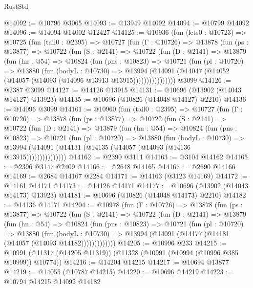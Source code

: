 \begin{lexlean}{RustStd}
\begin{coremodule}
@14092 := @10796 @3065
@14093 := @13949 @14092
@14094 := @10799 @14092
@14096 := @14094 @14002 @12427
@14125 := @10936
    (fun (lets0 : @10723) =>
    @10725
      (fun (tail0 : @2395) =>
      @10727
        (fun (Γ : @10726) =>
        @13878
          (fun (ps : @13877) =>
          @10722
            (fun (S : @2141) =>
            @10722
              (fun (D : @2141) =>
              @13879
                (fun (hn : @54) =>
                @10824
                  (fun (pns : @10823) =>
                  @10721
                    (fun (pl : @10720) =>
                    @13880
                      (fun (bodyL : @10730) =>
                      @13994
                        (@14091
                          (@14047 (@14052 (@14057 (@14093 (@14096 @13913 @13915))))))))))))))))
    @3099
@14126 := @2387 @3099
@14127 := @14126 @13915
@14131 := @10696 (@13902 (@14043 @14127) @13923)
@14135 := @10696 (@10826 (@14048 @14127) @2210)
@14136 := @14096 @3099
@14161 := @10960
    (fun (tail0 : @2395) =>
    @10727
      (fun (Γ : @10726) =>
      @13878
        (fun (ps : @13877) =>
        @10722
          (fun (S : @2141) =>
          @10722
            (fun (D : @2141) =>
            @13879
              (fun (hn : @54) =>
              @10824
                (fun (pns : @10823) =>
                @10721
                  (fun (pl : @10720) =>
                  @13880
                    (fun (bodyL : @10730) =>
                    @13994 (@14091 (@14131 (@14135 (@14057 (@14093 (@14136 @13915)))))))))))))))
@14162 := @2390 @3111
@14163 := @3104 @14162
@14165 := @2396 @3147 @2409
@14166 := @2648 @14165
@14167 := @2690 @14166
@14169 := @2684 @14167 @2284
@14171 := @14163 (@3123 @14169)
@14172 := @14161 @14171
@14173 := @14126 @14171
@14177 := @10696 (@13902 (@14043 @14173) @13923)
@14181 := @10696 (@10826 (@14048 @14173) @2210)
@14182 := @14136 @14171
@14204 := @10978
    (fun (Γ : @10726) =>
    @13878
      (fun (ps : @13877) =>
      @10722
        (fun (S : @2141) =>
        @10722
          (fun (D : @2141) =>
          @13879
            (fun (hn : @54) =>
            @10824
              (fun (pns : @10823) =>
              @10721
                (fun (pl : @10720) =>
                @13880
                  (fun (bodyL : @10730) =>
                  @13994 (@14091 (@14177 (@14181 (@14057 (@14093 @14182)))))))))))))
@14205 := @10996 @233
@14215 := @10991 (@11317 (@14205 @11319)) (@11328 (@10991 (@10994 (@10996 @385 @10999)) @10774))
@14216 := @14204 @14215
@14217 := @10694 @13877
@14219 := @14055 (@10787 @14215)
@14220 := @10696 @14219
@14223 := @10794 @14215 @14092 @14182

\end{coremodule}
\end{lexlean}
